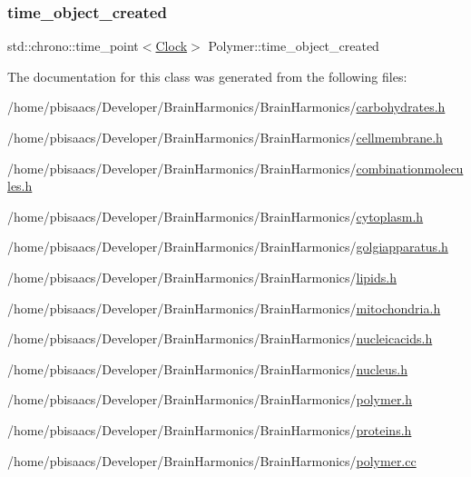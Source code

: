 \subsubsection{\texorpdfstring{time\+\_\+object\+\_\+created}{time\_object\_created}}
{\footnotesize\ttfamily std\+::chrono\+::time\+\_\+point$<$\mbox{\hyperlink{universe_8h_a0ef8d951d1ca5ab3cfaf7ab4c7a6fd80}{Clock}}$>$ Polymer\+::time\+\_\+object\+\_\+created\hspace{0.3cm}{\ttfamily [private]}}



The documentation for this class was generated from the following files\+:\begin{DoxyCompactItemize}
\item 
/home/pbisaacs/\+Developer/\+Brain\+Harmonics/\+Brain\+Harmonics/\mbox{\hyperlink{carbohydrates_8h}{carbohydrates.\+h}}\item 
/home/pbisaacs/\+Developer/\+Brain\+Harmonics/\+Brain\+Harmonics/\mbox{\hyperlink{cellmembrane_8h}{cellmembrane.\+h}}\item 
/home/pbisaacs/\+Developer/\+Brain\+Harmonics/\+Brain\+Harmonics/\mbox{\hyperlink{combinationmolecules_8h}{combinationmolecules.\+h}}\item 
/home/pbisaacs/\+Developer/\+Brain\+Harmonics/\+Brain\+Harmonics/\mbox{\hyperlink{cytoplasm_8h}{cytoplasm.\+h}}\item 
/home/pbisaacs/\+Developer/\+Brain\+Harmonics/\+Brain\+Harmonics/\mbox{\hyperlink{golgiapparatus_8h}{golgiapparatus.\+h}}\item 
/home/pbisaacs/\+Developer/\+Brain\+Harmonics/\+Brain\+Harmonics/\mbox{\hyperlink{lipids_8h}{lipids.\+h}}\item 
/home/pbisaacs/\+Developer/\+Brain\+Harmonics/\+Brain\+Harmonics/\mbox{\hyperlink{mitochondria_8h}{mitochondria.\+h}}\item 
/home/pbisaacs/\+Developer/\+Brain\+Harmonics/\+Brain\+Harmonics/\mbox{\hyperlink{nucleicacids_8h}{nucleicacids.\+h}}\item 
/home/pbisaacs/\+Developer/\+Brain\+Harmonics/\+Brain\+Harmonics/\mbox{\hyperlink{nucleus_8h}{nucleus.\+h}}\item 
/home/pbisaacs/\+Developer/\+Brain\+Harmonics/\+Brain\+Harmonics/\mbox{\hyperlink{polymer_8h}{polymer.\+h}}\item 
/home/pbisaacs/\+Developer/\+Brain\+Harmonics/\+Brain\+Harmonics/\mbox{\hyperlink{proteins_8h}{proteins.\+h}}\item 
/home/pbisaacs/\+Developer/\+Brain\+Harmonics/\+Brain\+Harmonics/\mbox{\hyperlink{polymer_8cc}{polymer.\+cc}}\end{DoxyCompactItemize}
